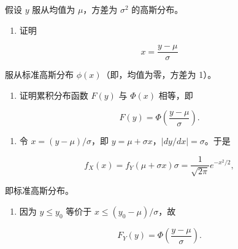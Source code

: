 \begin{question}
假设 \(y\) 服从均值为 \(\mu\)，方差为 \(\sigma^2\) 的高斯分布。

\begin{enumerate}
\item
  证明
\end{enumerate}

\[
x=\frac{y-\mu}{\sigma}
\]

服从标准高斯分布 \(\phi(x)\)（即，均值为零，方差为 1）。

\begin{enumerate}[start=2]
\item
  证明累积分布函数 \(F(y)\) 与 \(\Phi(x)\) 相等，即
\end{enumerate}

\[
F(y)=\Phi\left(\frac{y-\mu}{\sigma}\right).
\]
\begin{solution}
\begin{enumerate}
\item
  令 \(x=(y-\mu)/\sigma\)，即
  \(y=\mu+\sigma x\)，\(|dy/dx|=\sigma\)。于是
\end{enumerate}

\[
f_X(x)=f_Y(\mu+\sigma x)\sigma
=\frac1{\sqrt{2\pi}}e^{-x^2/2},
\]

即标准高斯分布。

\begin{enumerate}[start=2]
\item
  因为 \(y\le y_0\) 等价于 \(x\le (y_0-\mu)/\sigma\)，故
\end{enumerate}

\[
F_Y(y)=\Phi\left(\frac{y-\mu}{\sigma}\right).
\]
\end{solution}
\end{question}




